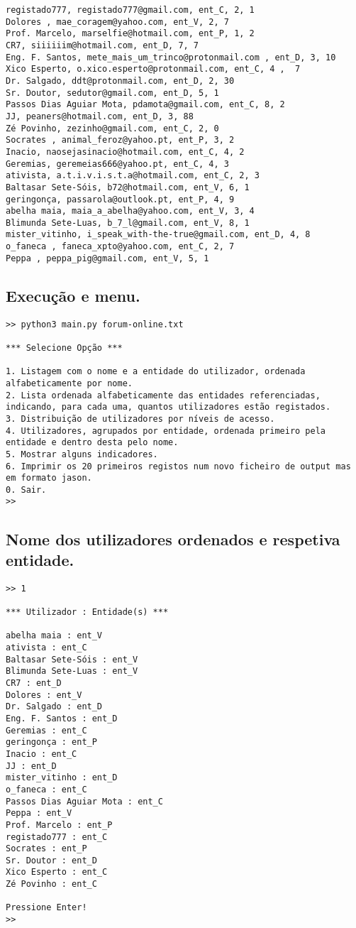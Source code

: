 \documentclass[11pt,a4paper]{report}%
\begin{document}
\begin{verbatim}
registado777, registado777@gmail.com, ent_C, 2, 1
Dolores , mae_coragem@yahoo.com, ent_V, 2, 7
Prof. Marcelo, marselfie@hotmail.com, ent_P, 1, 2
CR7, siiiiiim@hotmail.com, ent_D, 7, 7
Eng. F. Santos, mete_mais_um_trinco@protonmail.com , ent_D, 3, 10
Xico Esperto, o.xico.esperto@protonmail.com, ent_C, 4 ,  7
Dr. Salgado, ddt@protonmail.com, ent_D, 2, 30
Sr. Doutor, sedutor@gmail.com, ent_D, 5, 1
Passos Dias Aguiar Mota, pdamota@gmail.com, ent_C, 8, 2
JJ, peaners@hotmail.com, ent_D, 3, 88
Zé Povinho, zezinho@gmail.com, ent_C, 2, 0
Socrates , animal_feroz@yahoo.pt, ent_P, 3, 2
Inacio, naosejasinacio@hotmail.com, ent_C, 4, 2
Geremias, geremeias666@yahoo.pt, ent_C, 4, 3
ativista, a.t.i.v.i.s.t.a@hotmail.com, ent_C, 2, 3
Baltasar Sete-Sóis, b72@hotmail.com, ent_V, 6, 1
geringonça, passarola@outlook.pt, ent_P, 4, 9
abelha maia, maia_a_abelha@yahoo.com, ent_V, 3, 4
Blimunda Sete-Luas, b_7_l@gmail.com, ent_V, 8, 1
mister_vitinho, i_speak_with-the-true@gmail.com, ent_D, 4, 8
o_faneca , faneca_xpto@yahoo.com, ent_C, 2, 7
Peppa , peppa_pig@gmail.com, ent_V, 5, 1 
\end{verbatim}


\subsection{Execução e menu.}
\begin{scriptsize}
\begin{verbatim}
>> python3 main.py forum-online.txt

*** Selecione Opção ***

1. Listagem com o nome e a entidade do utilizador, ordenada alfabeticamente por nome.
2. Lista ordenada alfabeticamente das entidades referenciadas, indicando, para cada uma, quantos utilizadores estão registados.
3. Distribuição de utilizadores por níveis de acesso.
4. Utilizadores, agrupados por entidade, ordenada primeiro pela entidade e dentro desta pelo nome.
5. Mostrar alguns indicadores.
6. Imprimir os 20 primeiros registos num novo ficheiro de output mas em formato jason.
0. Sair.
>> 
\end{verbatim}
\end{scriptsize}

\subsection{Nome dos utilizadores ordenados e respetiva entidade.}

\begin{verbatim}
>> 1

*** Utilizador : Entidade(s) ***

abelha maia : ent_V
ativista : ent_C
Baltasar Sete-Sóis : ent_V
Blimunda Sete-Luas : ent_V
CR7 : ent_D
Dolores : ent_V
Dr. Salgado : ent_D
Eng. F. Santos : ent_D
Geremias : ent_C
geringonça : ent_P
Inacio : ent_C
JJ : ent_D
mister_vitinho : ent_D
o_faneca : ent_C
Passos Dias Aguiar Mota : ent_C
Peppa : ent_V
Prof. Marcelo : ent_P
registado777 : ent_C
Socrates : ent_P
Sr. Doutor : ent_D
Xico Esperto : ent_C
Zé Povinho : ent_C

Pressione Enter!
>> 
\end{verbatim}
\end{document}

